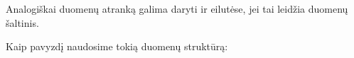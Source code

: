 \documentclass[letterpaper,10pt,lithuanian]{sphinxmanual}
\begin{document}
\sphinxAtStartPar
Analogiškai duomenų atranką galima daryti ir  eilutėse, jei tai leidžia
duomenų šaltinis.

\sphinxAtStartPar
Kaip pavyzdį naudosime tokią {\hyperref[\detokenize{savokos:term-JSON}]{}} duomenų struktūrą:

\begin{sphinxVerbatim}[commandchars=\\\{\}]
\PYG{p}{[}
\PYG{p}{[}\PYG{p}{]}
\PYG{p}{]}
\end{sphinxVerbatim}
\end{document}
